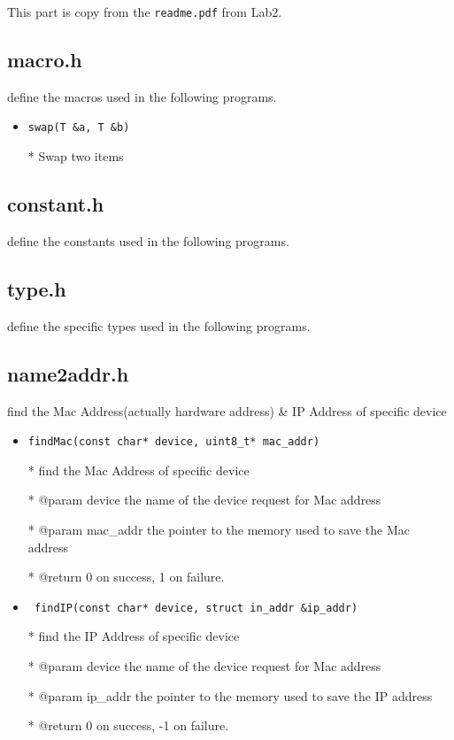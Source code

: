 \documentclass[11pt]{article}
\begin{document}
	\par This part is copy from the \texttt{readme.pdf} from Lab2.
	
	\subsection*{macro.h}
		\par define the macros used in the following programs.
		
		\begin{itemize}
		\item \texttt{swap(T \&a, T \&b)}
		
		* Swap two items
		\end{itemize}
		
	\subsection*{constant.h}
		\par define the constants used in the following programs.
		
	\subsection*{type.h}
		\par define the specific types used in the following programs.
		
	\subsection*{name2addr.h}
		\par find the Mac Address(actually hardware address) \& IP Address of specific device
	\begin{itemize}
		\item \texttt{findMac(const char* device, uint8\_t* mac\_addr)}
		
		* find the Mac Address of specific device
		
		* @param device the name of the device request for Mac address
		
		* @param mac\_addr the pointer to the memory used to save the
		Mac address
		
		* @return 0 on success, 1 on failure.
		
		\item \texttt{
			findIP(const char* device, struct in\_addr \&ip\_addr) }
		
		* find the IP Address of specific device
		
		* @param device the name of the device request for Mac address
		
		* @param ip\_addr the pointer to the memory used to save the IP address
		
		* @return 0 on success, -1 on failure.
	\end{itemize}
	
\end{document}
